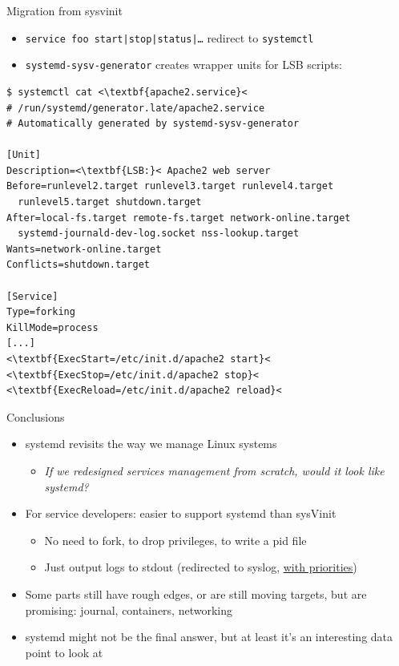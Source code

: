 \documentclass[11pt,final,usepdftitle=false]{beamer}
\begin{document}
\begin{frame}[fragile]{Migration from sysvinit}
\begin{itemize}
	\item \texttt{service foo start|stop|status|\ldots} redirect to \texttt{systemctl}
	\hbr
\item \texttt{systemd-sysv-generator} creates wrapper units for LSB scripts:
	\end{itemize}
	\vspace{-0.5em}
\begin{center}
\begin{adjustbox}{height=0.40\textheight,keepaspectratio}
\begin{lstlisting}[basicstyle=\ttfamily\tiny,escapeinside={<<}]
$ systemctl cat <\textbf{apache2.service}<
# /run/systemd/generator.late/apache2.service
# Automatically generated by systemd-sysv-generator

[Unit]
Description=<\textbf{LSB:}< Apache2 web server
Before=runlevel2.target runlevel3.target runlevel4.target
  runlevel5.target shutdown.target
After=local-fs.target remote-fs.target network-online.target
  systemd-journald-dev-log.socket nss-lookup.target
Wants=network-online.target
Conflicts=shutdown.target

[Service]
Type=forking
KillMode=process
[...]
<\textbf{ExecStart=/etc/init.d/apache2 start}<
<\textbf{ExecStop=/etc/init.d/apache2 stop}<
<\textbf{ExecReload=/etc/init.d/apache2 reload}<
\end{lstlisting}
\end{adjustbox}
\end{center}
\end{frame}

\begin{frame}{Conclusions}
	\begin{itemize}
		\item systemd revisits the way we manage Linux systems
			\begin{itemize}
			\item \textsl{If we redesigned services management from scratch, would it look like systemd?}
			\end{itemize}
			\hbr

		\item For service developers: easier to support systemd than sysVinit
					\begin{itemize}
						\item No need to fork, to drop privileges, to write a pid file
							\hbr
						\item Just output logs to stdout (redirected to syslog, \href{http://0pointer.net/blog/projects/journal-submit.html}{\ul{with priorities}})
					\end{itemize}
							\br

		\item Some parts still have rough edges, or are still moving targets, but are promising: journal, containers, networking
			\br
		\item systemd might not be the final answer, but at least it's an interesting data point to look at
	\end{itemize}
\end{frame}
\end{document}
